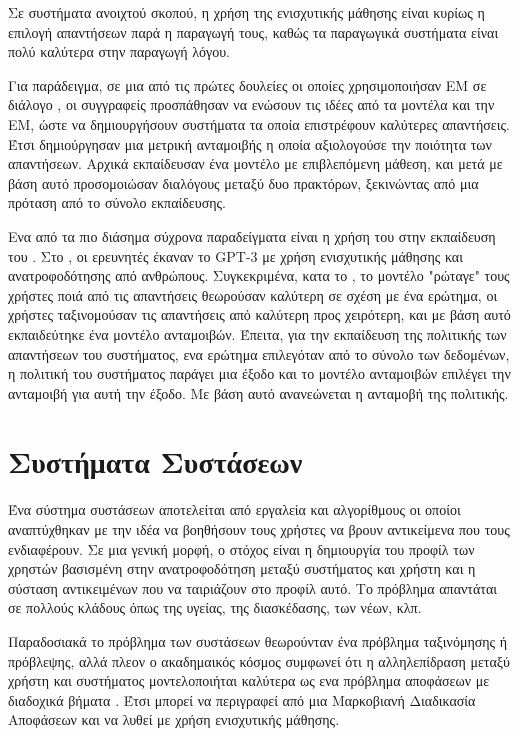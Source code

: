 Σε συστήματα ανοιχτού σκοπού, η χρήση της ενισχυτικής μάθησης είναι κυρίως η επιλογή απαντήσεων παρά η παραγωγή τους, καθώς τα παραγωγικά  συστήματα είναι πολύ καλύτερα στην παραγωγή λόγου. 

Για παράδειγμα, σε μια από τις πρώτες δουλείες οι οποίες χρησιμοποιήσαν ΕΜ σε διάλογο \cite{rl_dialogue_2016}, οι συγγραφείς προσπάθησαν να ενώσουν τις ιδέες από τα  μοντέλα και την ΕΜ, ώστε να δημιουργήσουν συστήματα τα οποία επιστρέφουν καλύτερες απαντήσεις. Έτσι δημιούργησαν μια μετρική ανταμοιβής η οποία αξιολογούσε την ποιότητα των απαντήσεων. Αρχικά εκπαίδευσαν ένα  μοντέλο με επιβλεπόμενη μάθεση, και μετά με βάση αυτό προσομοιώσαν διαλόγους μεταξύ δυο πρακτόρων, ξεκινώντας από μια πρόταση από το σύνολο εκπαίδευσης.

Ενα από τα πιο διάσημα σύχρονα παραδείγματα είναι η χρήση του στην εκπαίδευση του . Στο \cite{chatgpt_2022}, οι ερευνητές έκαναν  το {GPT-3} με χρήση ενισχυτικής μάθησης και ανατροφοδότησης από ανθρώπους. Συγκεκριμένα, κατα το , το μοντέλο "ρώταγε" τους χρήστες ποιά από τις απαντήσεις θεωρούσαν καλύτερη σε σχέση με ένα ερώτημα, οι χρήστες ταξινομούσαν τις απαντήσεις από καλύτερη προς χειρότερη, και με βάση αυτό εκπαιδεύτηκε ένα μοντέλο ανταμοιβών. Έπειτα, για την εκπαίδευση της πολιτικής των απαντήσεων του συστήματος, ενα ερώτημα επιλεγόταν από το σύνολο των δεδομένων, η πολιτική του συστήματος παράγει μια έξοδο και το μοντέλο ανταμοιβών επιλέγει την ανταμοιβή για αυτή την έξοδο. Με βάση αυτό ανανεώνεται η ανταμοβή της πολιτικής. 

\section{Συστήματα Συστάσεων}

Ένα σύστημα συστάσεων αποτελείται από εργαλεία και αλγορίθμους οι οποίοι αναπτύχθηκαν με την ιδέα να βοηθήσουν τους χρήστες να βρουν αντικείμενα που τους ενδιαφέρουν. Σε μια γενική μορφή, ο στόχος είναι η δημιουργία του προφίλ των χρηστών βασισμένη στην ανατροφοδότηση μεταξύ συστήματος και χρήστη και η σύσταση αντικειμένων που να ταιριάζουν στο προφίλ αυτό. Το πρόβλημα απαντάται σε πολλούς κλάδους όπως της υγείας, της διασκέδασης, των νέων, κλπ.

Παραδοσιακά το πρόβλημα των συστάσεων θεωρούνταν ένα πρόβλημα ταξινόμησης ή πρόβλεψης, αλλά πλεον ο ακαδημαικός κόσμος συμφωνεί ότι η αλληλεπίδραση μεταξύ χρήστη και συστήματος μοντελοποιήται καλύτερα ως ενα πρόβλημα αποφάσεων με διαδοχικά βήματα \cite{rl_recommenders_2021}. Έτσι μπορεί να περιγραφεί από μια Μαρκοβιανή Διαδικασία Αποφάσεων και να λυθεί με χρήση ενισχυτικής μάθησης.

